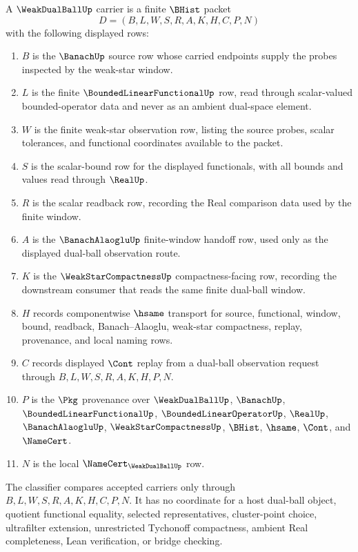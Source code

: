 \begin{definition}
\label{def:weak-dual-ball-carrier}
A $\WeakDualBallUp$ carrier is a finite $\BHist$ packet
$$
D=(B,L,W,S,R,A,K,H,C,P,N)
$$
with the following displayed rows:
\begin{enumerate}
\item $B$ is the $\BanachUp$ source row whose carried endpoints supply the probes inspected by the weak-star window.
\item $L$ is the finite $\BoundedLinearFunctionalUp$ row, read through scalar-valued bounded-operator data and never as an ambient dual-space element.
\item $W$ is the finite weak-star observation row, listing the source probes, scalar tolerances, and functional coordinates available to the packet.
\item $S$ is the scalar-bound row for the displayed functionals, with all bounds and values read through $\RealUp$.
\item $R$ is the scalar readback row, recording the Real comparison data used by the finite window.
\item $A$ is the $\BanachAlaogluUp$ finite-window handoff row, used only as the displayed dual-ball observation route.
\item $K$ is the $\WeakStarCompactnessUp$ compactness-facing row, recording the downstream consumer that reads the same finite dual-ball window.
\item $H$ records componentwise $\hsame$ transport for source, functional, window, bound, readback, Banach--Alaoglu, weak-star compactness, replay, provenance, and local naming rows.
\item $C$ records displayed $\Cont$ replay from a dual-ball observation request through $B,L,W,S,R,A,K,H,P,N$.
\item $P$ is the $\Pkg$ provenance over $\WeakDualBallUp$, $\BanachUp$, $\BoundedLinearFunctionalUp$, $\BoundedLinearOperatorUp$, $\RealUp$, $\BanachAlaogluUp$, $\WeakStarCompactnessUp$, $\BHist$, $\hsame$, $\Cont$, and $\NameCert$.
\item $N$ is the local $\NameCert_{\WeakDualBallUp}$ row.
\end{enumerate}
The classifier compares accepted carriers only through $B,L,W,S,R,A,K,H,C,P,N$. It has no coordinate for a host dual-ball object, quotient functional equality, selected representatives, cluster-point choice, ultrafilter extension, unrestricted Tychonoff compactness, ambient Real completeness, Lean verification, or bridge checking.
\end{definition}

